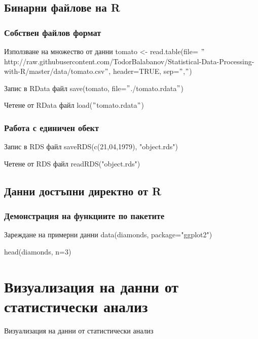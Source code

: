 \documentclass{beamer}
\begin{document}
\subsection{Бинарни файлове на R}

\begin{frame}
\frametitle{Собствен файлов формат}
\begin{block}{Използване на множество от данни}
tomato <- read.table(file= $"$http://raw.githubusercontent.com/TodorBalabanov/Statistical-Data-Processing-with-R/master/data/tomato.csv$"$, header=TRUE, sep=$"$,$"$)
\end{block}

\begin{block}{Запис в RData файл}
save(tomato, file=$"$./tomato.rdata$"$)
\end{block}

\begin{block}{Четене от RData файл}
load($"$tomato.rdata$"$)
\end{block}
\end{frame}

\begin{frame}
\frametitle{Работа с единичен обект}
\begin{block}{Запис в RDS файл}
saveRDS(c(21,04,1979), "object.rds")
\end{block}

\begin{block}{Четене от RDS файл}
readRDS("object.rds")
\end{block}
\end{frame}

\subsection{Данни достъпни директно от R}

\begin{frame}
\frametitle{Демонстрация на функциите по пакетите}
\begin{block}{Зареждане на примерни данни}
data(diamonds, package="ggplot2")

head(diamonds, n=3)
\end{block}
\end{frame}

\section{Визуализация на данни от статистически анализ}

\begin{frame}
\center \huge{Визуализация на данни от статистически анализ}
\end{frame}
\end{document}
